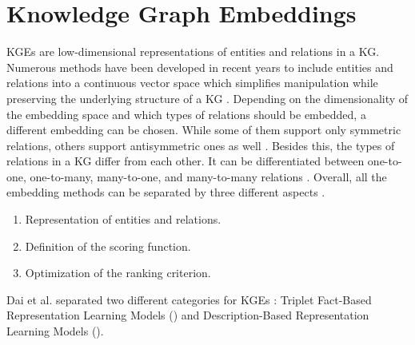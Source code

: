 \section{Knowledge Graph Embeddings} 
\label{sec:knowledge_graph_embeddings}
%
\acfp{KGE} are low-dimensional representations of entities and relations in a \ac{KG}. 
Numerous methods have been developed in recent years to include entities and relations into a continuous vector
space which simplifies manipulation while preserving the underlying structure of a KG \cite{8047276}.
Depending on the dimensionality of the embedding space and which types of relations should be embedded, a different embedding can be chosen.
While some of them support only symmetric relations, others support antisymmetric ones as well \cite{8047276}. 
\clearpage
Besides this, the types of relations in a \ac{KG} differ from each other.
It can be differentiated between one-to-one, one-to-many, many-to-one, and many-to-many relations \cite{8047276}.
Overall, all the embedding methods can be separated by three different aspects \cite{electronics9050750}.
\begin{enumerate}
    \item 
    Representation of entities and relations.
    
    \item 
    Definition of the scoring function.
    
    \item 
    Optimization of the ranking criterion.
\end{enumerate}
Dai et al. separated two different categories for \acp{KGE} \cite{electronics9050750}: 
Triplet Fact-Based Representation Learning Models () and Description-Based Representation Learning Models ().







